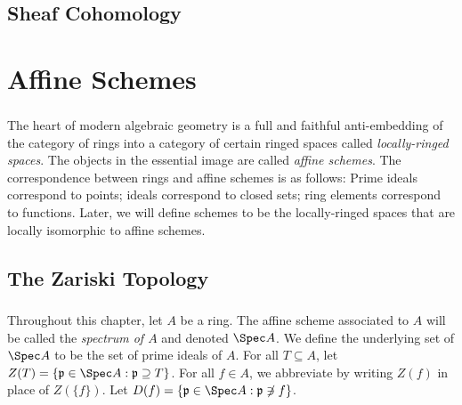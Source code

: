 \documentclass[10pt,final,oneside]{amsbook}
\numberwithin{equation}{section}
\begin{document}
\section{Sheaf Cohomology}

\subsection{}

\subsection{}


\chapter{Affine Schemes}

\subsection{}

The heart of modern algebraic geometry is a full and faithful anti-embedding of the category of rings into a category of certain ringed spaces called \emph{locally-ringed spaces}.
The objects in the essential image are called \emph{affine schemes}.
The correspondence between rings and affine schemes is as follows:
Prime ideals correspond to points; ideals correspond to closed sets; ring elements correspond to functions.
Later, we will define schemes to be the locally-ringed spaces that are locally isomorphic to affine schemes.

\section{The Zariski Topology}


\subsection{}

Throughout this chapter, let $A$ be a ring.
The affine scheme associated to $A$ will be called the \emph{spectrum of $A$} and denoted $\Spec A$.
We define the underlying set of $\Spec A$ to be the set of prime ideals of $A$.
For all $T \subseteq A$, let $Z(T) = \{\fr{p} \in \Spec A : \fr{p} \supseteq T\}$.
For all $f \in A$, we abbreviate by writing $Z(f)$ in place of $Z(\{f\})$.
Let $D(f) = \{\fr{p} \in \Spec A : \fr{p} \not\ni f\}$.
\end{document}

